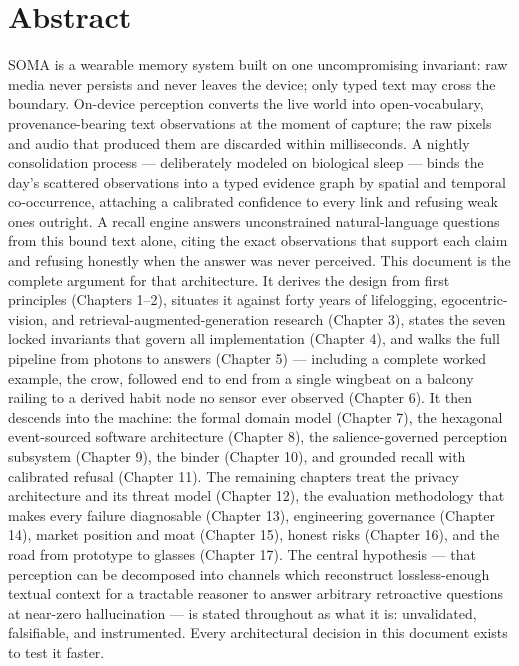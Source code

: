 \section{Abstract}\label{abstract}

SOMA is a wearable memory system built on one uncompromising invariant: raw media never persists and never leaves the device; only typed text may cross the boundary. On-device perception converts the live world into open-vocabulary, provenance-bearing text observations at the moment of capture; the raw pixels and audio that produced them are discarded within milliseconds. A nightly consolidation process --- deliberately modeled on biological sleep --- binds the day's scattered observations into a typed evidence graph by spatial and temporal co-occurrence, attaching a calibrated confidence to every link and refusing weak ones outright. A recall engine answers unconstrained natural-language questions from this bound text alone, citing the exact observations that support each claim and refusing honestly when the answer was never perceived. This document is the complete argument for that architecture. It derives the design from first principles (Chapters 1--2), situates it against forty years of lifelogging, egocentric-vision, and retrieval-augmented-generation research (Chapter 3), states the seven locked invariants that govern all implementation (Chapter 4), and walks the full pipeline from photons to answers (Chapter 5) --- including a complete worked example, the crow, followed end to end from a single wingbeat on a balcony railing to a derived habit node no sensor ever observed (Chapter 6). It then descends into the machine: the formal domain model (Chapter 7), the hexagonal event-sourced software architecture (Chapter 8), the salience-governed perception subsystem (Chapter 9), the binder (Chapter 10), and grounded recall with calibrated refusal (Chapter 11). The remaining chapters treat the privacy architecture and its threat model (Chapter 12), the evaluation methodology that makes every failure diagnosable (Chapter 13), engineering governance (Chapter 14), market position and moat (Chapter 15), honest risks (Chapter 16), and the road from prototype to glasses (Chapter 17). The central hypothesis --- that perception can be decomposed into channels which reconstruct lossless-enough textual context for a tractable reasoner to answer arbitrary retroactive questions at near-zero hallucination --- is stated throughout as what it is: unvalidated, falsifiable, and instrumented. Every architectural decision in this document exists to test it faster.


